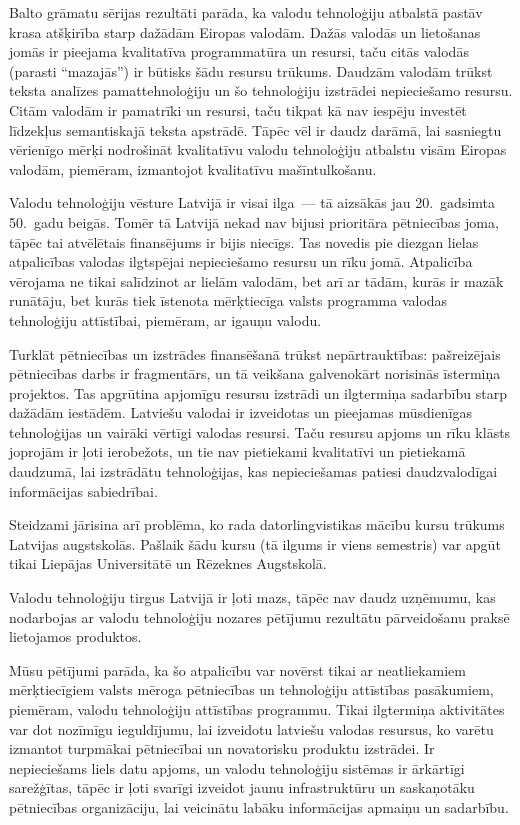 \begin{multicols}{2}
Balto grāmatu sērijas rezultāti parāda, ka valodu tehnoloģiju atbalstā pastāv krasa atšķirība starp dažādām Eiropas valodām.
Dažās valodās un lietošanas jomās ir pieejama kvalitatīva programmatūra un resursi, taču citās valodās (parasti ``mazajās'') ir būtisks šādu resursu trūkums.
Daudzām valodām trūkst teksta analīzes pamattehnoloģiju un šo tehnoloģiju izstrādei nepieciešamo resursu.
Citām valodām ir pamatrīki un resursi, taču tikpat kā nav iespēju investēt līdzekļus semantiskajā teksta apstrādē.
Tāpēc vēl ir daudz darāmā, lai sasniegtu vērienīgo mērķi nodrošināt kvalitatīvu valodu tehnoloģiju atbalstu visām Eiropas valodām, piemēram, izmantojot kvalitatīvu mašīntulkošanu.

Valodu tehnoloģiju vēsture Latvijā ir visai ilga~--- tā aizsākās jau 20.~gadsimta 50.~gadu beigās.
Tomēr tā Latvijā nekad nav bijusi prioritāra pētniecības joma, tāpēc tai atvēlētais finansējums ir bijis niecīgs.
Tas novedis pie diezgan lielas atpalicības valodas ilgtspējai nepieciešamo resursu un rīku jomā. 
Atpalicība vērojama ne tikai salīdzinot ar lielām valodām, bet arī ar tādām, kurās ir mazāk runātāju, bet kurās tiek īstenota mērķtiecīga valsts programma valodas tehnoloģiju attīstībai, piemēram, ar igauņu valodu.

Turklāt pētniecības un izstrādes finansēšanā trūkst nepārtrauktības: pašreizējais pētniecības darbs ir fragmentārs, un tā veikšana galvenokārt norisinās īstermiņa projektos.
Tas apgrūtina apjomīgu resursu izstrādi un ilgtermiņa sadarbību starp dažādām iestādēm. 
Latviešu valodai ir izveidotas un pieejamas mūsdienīgas tehnoloģijas un vairāki vērtīgi valodas resursi. 
Taču resursu apjoms un rīku klāsts joprojām ir ļoti ierobežots, un tie nav pietiekami kvalitatīvi un pietiekamā daudzumā, lai izstrādātu tehnoloģijas, kas nepieciešamas patiesi daudzvalodīgai informācijas sabiedrībai. 

Steidzami jārisina arī problēma, ko rada datorling\-vistikas mācību kursu trūkums Latvijas augstskolās.
Pašlaik šādu kursu (tā ilgums ir viens semestris) var apgūt tikai Liepājas Universitātē un Rēzeknes Augstskolā.

Valodu tehnoloģiju tirgus Latvijā ir ļoti mazs, tāpēc nav daudz uzņēmumu, kas nodarbojas ar valodu tehnoloģiju nozares pētījumu rezultātu pārveidošanu praksē lietojamos produktos. 

Mūsu pētījumi parāda, ka šo atpalicību var novērst tikai ar neatliekamiem mērķtiecīgiem valsts mēroga pētniecības un tehnoloģiju attīstības pasākumiem, piemēram, valodu tehnoloģiju attīstības programmu.
Tikai ilgtermiņa aktivitātes var dot nozīmīgu ieguldījumu, lai izveidotu latviešu valodas resursus, ko varētu izmantot turpmākai pētniecībai un novatorisku produktu izstrādei.
Ir nepieciešams liels datu apjoms, un valodu tehnoloģiju sistēmas ir ārkārtīgi sarežģītas, tāpēc ir ļoti svarīgi izveidot jaunu infrastruktūru un saskaņotāku pētniecības organizāciju, lai veicinātu labāku informācijas apmaiņu un sadarbību.


\end{multicols}
